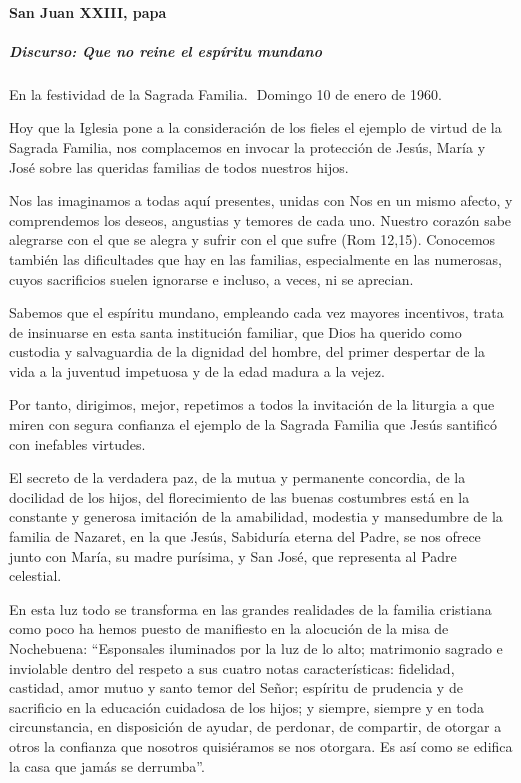 \documentclass[]{article}
\let\oldparagraph\paragraph
\renewcommand{\paragraph}[1]{\oldparagraph{#1}\mbox{}}
\let\oldsubparagraph\subparagraph
\renewcommand{\subparagraph}[1]{\oldsubparagraph{#1}\mbox{}}
\begin{document}
\paragraph{San Juan XXIII, papa}\label{san-juan-xxiii-papa}

\subparagraph{Discurso: Que no reine el espíritu
mundano}\label{discurso-que-no-reine-el-espuxedritu-mundano}

En la festividad de la Sagrada Familia.  Domingo 10 de enero de 1960.

Hoy que la Iglesia pone a la consideración de los fieles el ejemplo de
virtud de la Sagrada Familia, nos complacemos en invocar la protección
de Jesús, María y José sobre las queridas familias de todos nuestros
hijos.

Nos las imaginamos a todas aquí presentes, unidas con Nos en un mismo
afecto, y comprendemos los deseos, angustias y temores de cada uno.
Nuestro corazón sabe alegrarse con el que se alegra y sufrir con el que
sufre (Rom 12,15). Conocemos también las dificultades que hay en las
familias, especialmente en las numerosas, cuyos sacrificios suelen
ignorarse e incluso, a veces, ni se aprecian.

Sabemos que el espíritu mundano, empleando cada vez mayores incentivos,
trata de insinuarse en esta santa institución familiar, que Dios ha
querido como custodia y salvaguardia de la dignidad del hombre, del
primer despertar de la vida a la juventud impetuosa y de la edad madura
a la vejez.

Por tanto, dirigimos, mejor, repetimos a todos la invitación de la
liturgia a que miren con segura confianza el ejemplo de la Sagrada
Familia que Jesús santificó con inefables virtudes.

El secreto de la verdadera paz, de la mutua y permanente concordia, de
la docilidad de los hijos, del florecimiento de las buenas costumbres
está en la constante y generosa imitación de la amabilidad, modestia y
mansedumbre de la familia de Nazaret, en la que Jesús, Sabiduría eterna
del Padre, se nos ofrece junto con María, su madre purísima, y San José,
que representa al Padre celestial.

En esta luz todo se transforma en las grandes realidades de la familia
cristiana como poco ha hemos puesto de manifiesto en la alocución de la
misa de Nochebuena: ``Esponsales iluminados por la luz de lo alto;
matrimonio sagrado e inviolable dentro del respeto a sus cuatro notas
características: fidelidad, castidad, amor mutuo y santo temor del
Señor; espíritu de prudencia y de sacrificio en la educación cuidadosa
de los hijos; y siempre, siempre y en toda circunstancia, en disposición
de ayudar, de perdonar, de compartir, de otorgar a otros la confianza
que nosotros quisiéramos se nos otorgara. Es así como se edifica la casa
que jamás se derrumba''.
\end{document}
